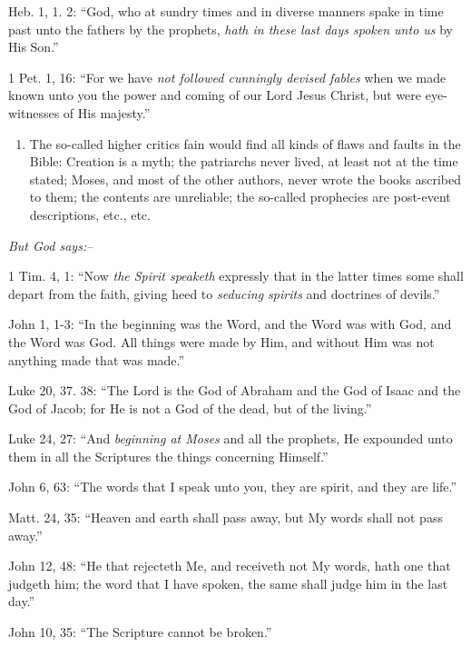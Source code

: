 \documentclass[
]{book}
\providecommand{\tightlist}{%
  \setlength{\itemsep}{0pt}\setlength{\parskip}{0pt}}
\begin{document}
Heb. 1, 1. 2: ``God, who at sundry times and in diverse manners spake in time past unto the fathers by the prophets, \emph{hath in these last days spoken unto us} by His Son.''

1 Pet. 1, 16: ``For we have \emph{not followed cunningly devised fables} when we made known unto you the power and coming of our Lord Jesus Christ, but were eye-witnesses of His majesty.''

\begin{enumerate}
\def\labelenumi{\arabic{enumi}.}
\setcounter{enumi}{1}
\tightlist
\item
  The so-called higher critics fain would find all kinds of flaws and faults in the Bible: Creation is a myth; the patriarchs never lived, at least not at the time stated; Moses, and most of the other authors, never wrote the books ascribed to them; the contents are unreliable; the so-called prophecies are post-event descriptions, etc., etc.
\end{enumerate}

\begin{center}
\textsl{But God says:--}
\end{center}

1 Tim. 4, 1: ``Now \emph{the Spirit speaketh} expressly that in the latter times some shall depart from the faith, giving heed to \emph{seducing spirits} and doctrines of devils.''

John 1, 1-3: ``In the beginning was the Word, and the Word was with God, and the Word was God. All things were made by Him, and without Him was not anything made that was made.''

Luke 20, 37. 38: ``The Lord is the God of Abraham and the God of Isaac and the God of Jacob; for He is not a God of the dead, but of the living.''

Luke 24, 27: ``And \emph{beginning at Moses} and all the prophets, He expounded unto them in all the Scriptures the things concerning Himself.''

John 6, 63: ``The words that I speak unto you, they are spirit, and they are life.''

Matt. 24, 35: ``Heaven and earth shall pass away, but My words shall not pass away.''

John 12, 48: ``He that rejecteth Me, and receiveth not My words, hath one that judgeth him; the word that I have spoken, the same shall judge him in the last day.''

John 10, 35: ``The Scripture cannot be broken.''
\end{document}
